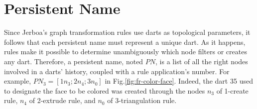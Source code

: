 
\section{Persistent Name}




Since Jerboa's graph transformation rules use darts as topological parameters,
it follows that each persistent name must represent a unique dart. As it
happens, rules make it possible to determine unambiguously which node filters or
creates any dart. %
Therefore, a persistent name, noted $PN$, is a list of all the right nodes involved in a darts' history, coupled with a rule application's number.
For example, $PN_3=[1n_{3};2n_{4};3n_{0}]$ in Fig.\ref{fig:fr-color-face}. Indeed, the dart 35 used to designate the face to be colored was created through the nodes $n_3$ of 1-create rule, $n_4$ of 2-extrude rule, and $n_0$ of 3-triangulation rule.


